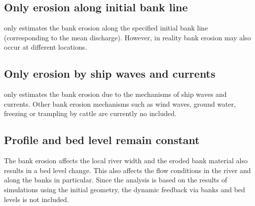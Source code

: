 \subsection{Only erosion along initial bank line}

\dfastbe only estimates the bank erosion along the specified initial bank line (corresponding to the mean discharge).
However, in reality bank erosion may also occur at different locations.

\subsection{Only erosion by ship waves and currents}

\dfastbe only estimates the bank erosion due to the mechanisms of ship waves and currents.
Other bank erosion mechanisms such as wind waves, ground water, freezing or trampling by cattle are currently no included.

\subsection{Profile and bed level remain constant}

The bank erosion affects the local river width and the eroded bank material also results in a bed level change.
This also affects the flow conditions in the river and along the banks in particular.
Since the analysis is based on the results of \dflowfm simulations using the initial geometry, the dynamic feedback via banks and bed levels is not included.
